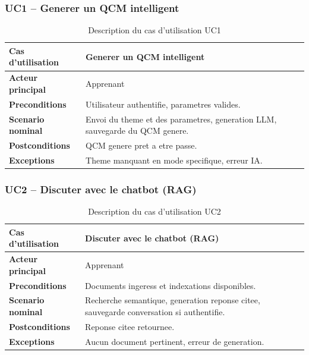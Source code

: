 \documentclass[a4paper,12pt]{report}
\begin{document}
\subsubsection{UC1 -- Generer un QCM intelligent}
\begin{table}[H]
  \centering
  \caption{Description du cas d'utilisation UC1}
  \begin{tabularx}{\textwidth}{>{\bfseries}p{4cm} X}
    \toprule
    Cas d'utilisation & Generer un QCM intelligent \\
    \midrule
    Acteur principal & Apprenant \\
    Preconditions & Utilisateur authentifie, parametres valides. \\
    Scenario nominal & Envoi du theme et des parametres, generation LLM,
                       sauvegarde du QCM genere. \\
    Postconditions & QCM genere pret a etre passe. \\
    Exceptions & Theme manquant en mode specifique, erreur IA. \\
    \bottomrule
  \end{tabularx}
\end{table}

\subsubsection{UC2 -- Discuter avec le chatbot (RAG)}
\begin{table}[H]
  \centering
  \caption{Description du cas d'utilisation UC2}
  \begin{tabularx}{\textwidth}{>{\bfseries}p{4cm} X}
    \toprule
    Cas d'utilisation & Discuter avec le chatbot (RAG) \\
    \midrule
    Acteur principal & Apprenant \\
    Preconditions & Documents ingeress et indexations disponibles. \\
    Scenario nominal & Recherche semantique, generation reponse citee,
                       sauvegarde conversation si authentifie. \\
    Postconditions & Reponse citee retournee. \\
    Exceptions & Aucun document pertinent, erreur de generation. \\
    \bottomrule
  \end{tabularx}
\end{table}
\end{document}

